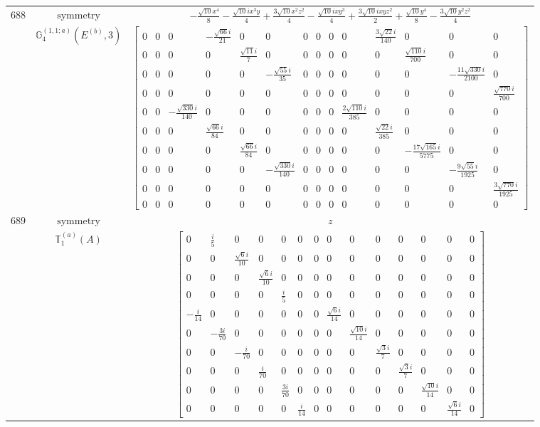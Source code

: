 \documentclass[fleqn,8pt,landscape]{jsarticle}
\begin{document}
\begin{longtable}{ccc}
$ 688 $ & $ \text{symmetry} $ & $ - \frac{\sqrt{10} x^{4}}{8} - \frac{\sqrt{10} i x^{3} y}{4} + \frac{3 \sqrt{10} x^{2} z^{2}}{4} - \frac{\sqrt{10} i x y^{3}}{4} + \frac{3 \sqrt{10} i x y z^{2}}{2} + \frac{\sqrt{10} y^{4}}{8} - \frac{3 \sqrt{10} y^{2} z^{2}}{4} $ \\
$  $ & $ \mathbb{G}_{4}^{(1,1;a)}(E^{(b)},3) $ & $ \begin{bmatrix} 0 & 0 & 0 & - \frac{\sqrt{66} i}{21} & 0 & 0 & 0 & 0 & 0 & 0 & \frac{3 \sqrt{22} i}{140} & 0 & 0 & 0 \\ 0 & 0 & 0 & 0 & \frac{\sqrt{11} i}{7} & 0 & 0 & 0 & 0 & 0 & 0 & \frac{\sqrt{110} i}{700} & 0 & 0 \\ 0 & 0 & 0 & 0 & 0 & - \frac{\sqrt{55} i}{35} & 0 & 0 & 0 & 0 & 0 & 0 & - \frac{11 \sqrt{330} i}{2100} & 0 \\ 0 & 0 & 0 & 0 & 0 & 0 & 0 & 0 & 0 & 0 & 0 & 0 & 0 & \frac{\sqrt{770} i}{700} \\ 0 & 0 & - \frac{\sqrt{330} i}{140} & 0 & 0 & 0 & 0 & 0 & 0 & \frac{2 \sqrt{110} i}{385} & 0 & 0 & 0 & 0 \\ 0 & 0 & 0 & \frac{\sqrt{66} i}{84} & 0 & 0 & 0 & 0 & 0 & 0 & \frac{\sqrt{22} i}{385} & 0 & 0 & 0 \\ 0 & 0 & 0 & 0 & \frac{\sqrt{66} i}{84} & 0 & 0 & 0 & 0 & 0 & 0 & - \frac{17 \sqrt{165} i}{5775} & 0 & 0 \\ 0 & 0 & 0 & 0 & 0 & - \frac{\sqrt{330} i}{140} & 0 & 0 & 0 & 0 & 0 & 0 & - \frac{9 \sqrt{55} i}{1925} & 0 \\ 0 & 0 & 0 & 0 & 0 & 0 & 0 & 0 & 0 & 0 & 0 & 0 & 0 & \frac{3 \sqrt{770} i}{1925} \\ 0 & 0 & 0 & 0 & 0 & 0 & 0 & 0 & 0 & 0 & 0 & 0 & 0 & 0 \end{bmatrix} $ \\ \hline
$ 689 $ & $ \text{symmetry} $ & $ z $ \\
$  $ & $ \mathbb{T}_{1}^{(a)}(A) $ & $ \begin{bmatrix} 0 & \frac{i}{5} & 0 & 0 & 0 & 0 & 0 & 0 & 0 & 0 & 0 & 0 & 0 & 0 \\ 0 & 0 & \frac{\sqrt{6} i}{10} & 0 & 0 & 0 & 0 & 0 & 0 & 0 & 0 & 0 & 0 & 0 \\ 0 & 0 & 0 & \frac{\sqrt{6} i}{10} & 0 & 0 & 0 & 0 & 0 & 0 & 0 & 0 & 0 & 0 \\ 0 & 0 & 0 & 0 & \frac{i}{5} & 0 & 0 & 0 & 0 & 0 & 0 & 0 & 0 & 0 \\ - \frac{i}{14} & 0 & 0 & 0 & 0 & 0 & 0 & \frac{\sqrt{6} i}{14} & 0 & 0 & 0 & 0 & 0 & 0 \\ 0 & - \frac{3 i}{70} & 0 & 0 & 0 & 0 & 0 & 0 & \frac{\sqrt{10} i}{14} & 0 & 0 & 0 & 0 & 0 \\ 0 & 0 & - \frac{i}{70} & 0 & 0 & 0 & 0 & 0 & 0 & \frac{\sqrt{3} i}{7} & 0 & 0 & 0 & 0 \\ 0 & 0 & 0 & \frac{i}{70} & 0 & 0 & 0 & 0 & 0 & 0 & \frac{\sqrt{3} i}{7} & 0 & 0 & 0 \\ 0 & 0 & 0 & 0 & \frac{3 i}{70} & 0 & 0 & 0 & 0 & 0 & 0 & \frac{\sqrt{10} i}{14} & 0 & 0 \\ 0 & 0 & 0 & 0 & 0 & \frac{i}{14} & 0 & 0 & 0 & 0 & 0 & 0 & \frac{\sqrt{6} i}{14} & 0 \end{bmatrix} $ \\ \hline

\end{longtable}
\end{document}
